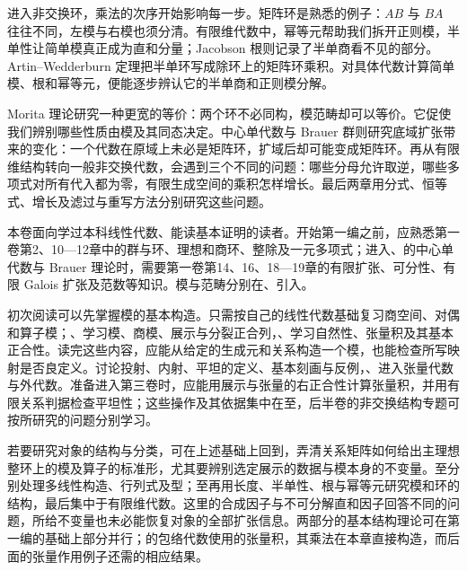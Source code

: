 \ProseParagraphBreak
进入非交换环，乘法的次序开始影响每一步。矩阵环是熟悉的例子：\(AB\) 与 \(BA\) 往往不同，左模与右模也须分清。有限维代数中，幂等元帮助我们拆开正则模，半单性让简单模真正成为直和分量；Jacobson 根则记录了半单商看不见的部分。Artin--Wedderburn 定理把半单环写成除环上的矩阵环乘积。对具体代数计算简单模、根和幂等元，便能逐步辨认它的半单商和正则模分解。

\ProseParagraphBreak
Morita 理论研究一种更宽的等价：两个环不必同构，模范畴却可以等价。它促使我们辨别哪些性质由模及其同态决定。中心单代数与 Brauer 群则研究底域扩张带来的变化：一个代数在原域上未必是矩阵环，扩域后却可能变成矩阵环。再从有限维结构转向一般非交换代数，会遇到三个不同的问题：哪些分母允许取逆，哪些多项式对所有代入都为零，有限生成空间的乘积怎样增长。最后两章用分式、恒等式、增长及滤过与重写方法分别研究这些问题。

\ProseParagraphBreak
本卷面向学过本科线性代数、能读基本证明的读者。开始第一编之前，应熟悉第一卷第2、10—12章中的群与环、理想和商环、整除及一元多项式；进入、的中心单代数与 Brauer 理论时，需要第一卷第14、16、18—19章的有限扩张、可分性、有限 Galois 扩张及范数等知识。模与范畴分别在、引入。

\ProseParagraphBreak
初次阅读可以先掌握模的基本构造。只需按自己的线性代数基础复习商空间、对偶和算子模；、学习模、商模、展示与分裂正合列，、学习自然性、张量积及其基本正合性。读完这些内容，应能从给定的生成元和关系构造一个模，也能检查所写映射是否良定义。讨论投射、内射、平坦的定义、基本刻画与反例，、进入张量代数与外代数。准备进入第三卷时，应能用展示与张量的右正合性计算张量积，并用有限关系判据检查平坦性；这些操作及其依据集中在至，后半卷的非交换结构专题可按所研究的问题分别学习。

\ProseParagraphBreak
若要研究对象的结构与分类，可在上述基础上回到，弄清关系矩阵如何给出主理想整环上的模及算子的标准形，尤其要辨别选定展示的数据与模本身的不变量。至分别处理多线性构造、行列式及型；至再用长度、半单性、根与幂等元研究模和环的结构，最后集中于有限维代数。这里的合成因子与不可分解直和因子回答不同的问题，所给不变量也未必能恢复对象的全部扩张信息。两部分的基本结构理论可在第一编的基础上部分并行；的包络代数使用的张量积，其乘法在本章直接构造，而后面的张量作用例子还需的相应结果。

